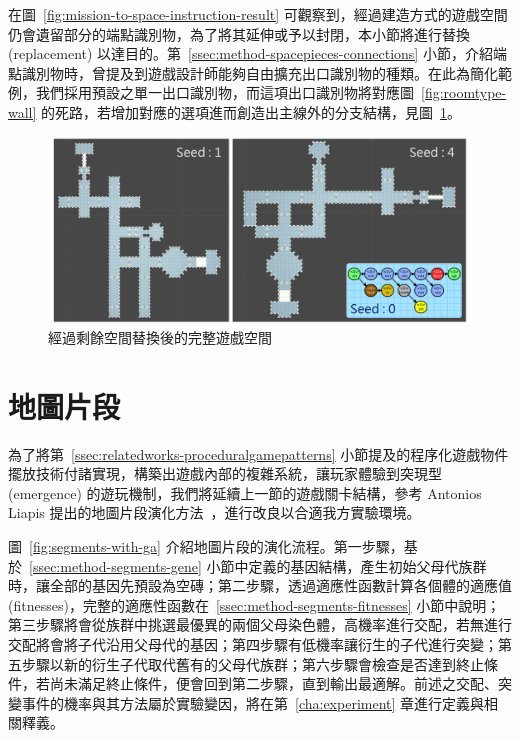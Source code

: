 在圖~\ref{fig:mission-to-space-instruction-result} 可觀察到，經過建造方式的遊戲空間仍會遺留部分的端點識別物，為了將其延伸或予以封閉，本小節將進行替換 (replacement) 以達目的。第~\ref{ssec:method-spacepieces-connections} 小節，介紹端點識別物時，曾提及到遊戲設計師能夠自由擴充出口識別物的種類。在此為簡化範例，我們採用預設之單一出口識別物，而這項出口識別物將對應圖~\ref{fig:roomtype-wall} 的死路，若增加對應的選項進而創造出主線外的分支結構，見圖~\ref{fig:mission-to-space-replacement-result}。

\begin{figure}[ht]
  \begin{center}
    \includegraphics[width=1.0\textwidth]{figures/mission-to-space-replacement-result.png}
    \caption{經過剩餘空間替換後的完整遊戲空間} 
    \label{fig:mission-to-space-replacement-result}
  \end{center}
\end{figure}

\clearpage

\section{地圖片段}
\label{sec:method-segments}

為了將第~\ref{ssec:relatedworks-proceduralgamepatterns} 小節提及的程序化遊戲物件擺放技術付諸實現，構築出遊戲內部的複雜系統，讓玩家體驗到突現型 (emergence) 的遊玩機制，我們將延續上一節的遊戲關卡結構，參考 Antonios Liapis 提出的地圖片段演化方法~\cite{liapis2017multi}，進行改良以合適我方實驗環境。

圖~\ref{fig:segments-with-ga} 介紹地圖片段的演化流程。第一步驟，基於~\ref{ssec:method-segments-gene} 小節中定義的基因結構，產生初始父母代族群時，讓全部的基因先預設為空磚；第二步驟，透過適應性函數計算各個體的適應值 (fitnesses)，完整的適應性函數在~\ref{ssec:method-segments-fitnesses} 小節中說明；第三步驟將會從族群中挑選最優異的兩個父母染色體，高機率進行交配，若無進行交配將會將子代沿用父母代的基因；第四步驟有低機率讓衍生的子代進行突變；第五步驟以新的衍生子代取代舊有的父母代族群；第六步驟會檢查是否達到終止條件，若尚未滿足終止條件，便會回到第二步驟，直到輸出最適解。前述之交配、突變事件的機率與其方法屬於實驗變因，將在第~\ref{cha:experiment} 章進行定義與相關釋義。

